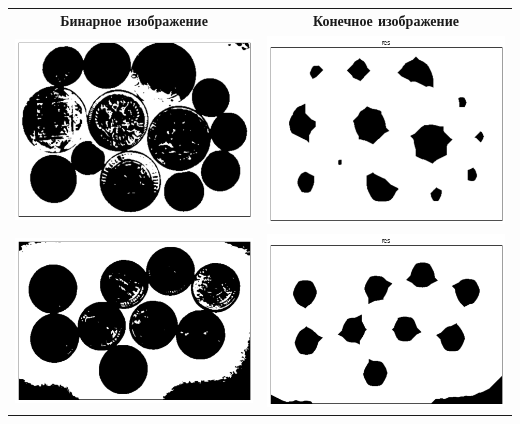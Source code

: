 \documentclass[12pt, a4paper]{article}
\begin{document}
		\begin{center}
		\begin{tabular}{c c}
			{\bf Бинарное изображение} & {\bf Конечное изображение} \\
			\includegraphics[width=8cm]{Money_1_bin.png} & \includegraphics[width=8cm]{Money_1_res.png} \\
			\includegraphics[width=8cm]{Money_2_bin.png} & \includegraphics[width=8cm]{Money_2_res.png} \\

\end{tabular}
\end{center}
\end{document}
